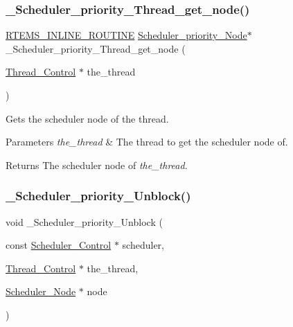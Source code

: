 \subsubsection{\texorpdfstring{\_Scheduler\_priority\_Thread\_get\_node()}{\_Scheduler\_priority\_Thread\_get\_node()}}
{\footnotesize\ttfamily \mbox{\hyperlink{group__RTEMSScoreBaseDefs_gac216239df231d5dbd15e3520b0b9313f}{R\+T\+E\+M\+S\+\_\+\+I\+N\+L\+I\+N\+E\+\_\+\+R\+O\+U\+T\+I\+NE}} \mbox{\hyperlink{structScheduler__priority__Node}{Scheduler\+\_\+priority\+\_\+\+Node}}$\ast$ \+\_\+\+Scheduler\+\_\+priority\+\_\+\+Thread\+\_\+get\+\_\+node (\begin{DoxyParamCaption}\item[{\mbox{\hyperlink{struct__Thread__Control}{Thread\+\_\+\+Control}} $\ast$}]{the\+\_\+thread }\end{DoxyParamCaption})}



Gets the scheduler node of the thread. 


\begin{DoxyParams}{Parameters}
{\em the\+\_\+thread} & The thread to get the scheduler node of.\\
\hline
\end{DoxyParams}
\begin{DoxyReturn}{Returns}
The scheduler node of {\itshape the\+\_\+thread}. 
\end{DoxyReturn}
\mbox{\label{group__RTEMSScoreSchedulerDPS_ga2a24da77012650161d32bed57eb5c128}} 
\subsubsection{\texorpdfstring{\_Scheduler\_priority\_Unblock()}{\_Scheduler\_priority\_Unblock()}}
{\footnotesize\ttfamily void \+\_\+\+Scheduler\+\_\+priority\+\_\+\+Unblock (\begin{DoxyParamCaption}\item[{const \mbox{\hyperlink{struct__Scheduler__Control}{Scheduler\+\_\+\+Control}} $\ast$}]{scheduler,  }\item[{\mbox{\hyperlink{struct__Thread__Control}{Thread\+\_\+\+Control}} $\ast$}]{the\+\_\+thread,  }\item[{\mbox{\hyperlink{structScheduler__Node}{Scheduler\+\_\+\+Node}} $\ast$}]{node }\end{DoxyParamCaption})}



